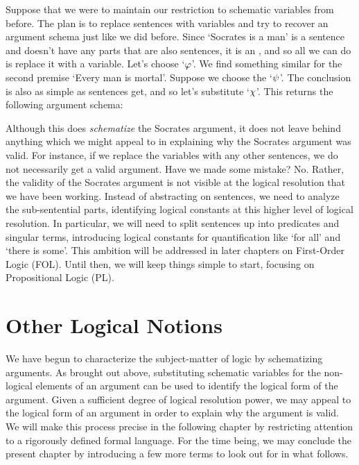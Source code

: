 Suppose that we were to maintain our restriction to schematic variables from before.
The plan is to replace sentences with variables and try to recover an argument schema just like we did before.
Since `Socrates is a man' is a sentence and doesn't have any parts that are also sentences, it is an , and so all we can do is replace it with a variable.
Let's choose `$\metaA$'. 
We find something similar for the second premise `Every man is mortal'.
Suppose we choose the `$\metaB$'.
The conclusion is also as simple as sentences get, and so let's substitute `$\metaC$'.
This returns the following argument schema:

\begin{earg}
  \eitem{$\metaA$}
  \uitem{$\metaB$\quad}
  \eitem{$\metaC$}
\end{earg}

Although this does \textit{schematize} the Socrates argument, it does not leave behind anything which we might appeal to in explaining why the Socrates argument was valid.
For instance, if we replace the variables with any other sentences, we do not necessarily get a valid argument.
Have we made some mistake?
No.
Rather, the validity of the Socrates argument is not visible at the logical resolution that we have been working.
Instead of abstracting on sentences, we need to analyze the sub-sentential parts, identifying logical constants at this higher level of logical resolution.
In particular, we will need to split sentences up into predicates and singular terms, introducing logical constants for quantification like `for all' and `there is some'.
This ambition will be addressed in later chapters on First-Order Logic (FOL).
Until then, we will keep things simple to start, focusing on Propositional Logic (PL).





\section{Other Logical Notions}

We have begun to characterize the subject-matter of logic by schematizing arguments.
As brought out above, substituting schematic variables for the non-logical elements of an argument can be used to identify the logical form of the argument.
Given a sufficient degree of logical resolution power, we may appeal to the logical form of an argument in order to explain why the argument is valid.
We will make this process precise in the following chapter by restricting attention to a rigorously defined formal language.
For the time being, we may conclude the present chapter by introducing a few more terms to look out for in what follows.


